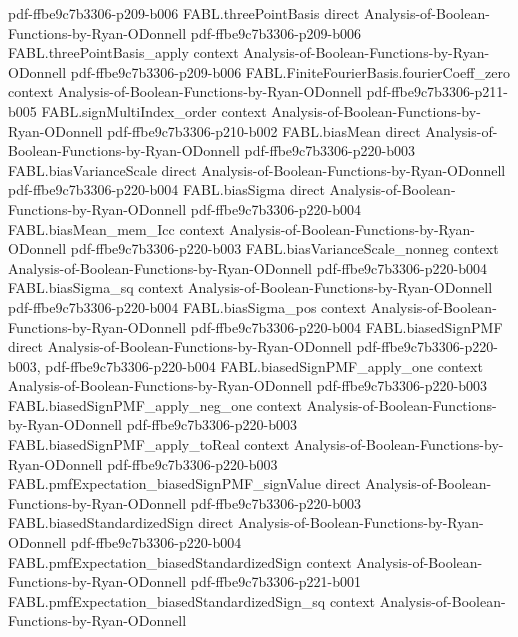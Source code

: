 \begin{theorem}
  {pdf-ffbe9c7b3306-p209-b006}
\proofstep
  {FABL.threePointBasis}
  {direct}
  {Analysis-of-Boolean-Functions-by-Ryan-ODonnell}
  {pdf-ffbe9c7b3306-p209-b006}
\proofstep
  {FABL.threePointBasis_apply}
  {context}
  {Analysis-of-Boolean-Functions-by-Ryan-ODonnell}
  {pdf-ffbe9c7b3306-p209-b006}
\proofstep
  {FABL.FiniteFourierBasis.fourierCoeff_zero}
  {context}
  {Analysis-of-Boolean-Functions-by-Ryan-ODonnell}
  {pdf-ffbe9c7b3306-p211-b005}
\proofstep
  {FABL.signMultiIndex_order}
  {context}
  {Analysis-of-Boolean-Functions-by-Ryan-ODonnell}
  {pdf-ffbe9c7b3306-p210-b002}
\proofstep
  {FABL.biasMean}
  {direct}
  {Analysis-of-Boolean-Functions-by-Ryan-ODonnell}
  {pdf-ffbe9c7b3306-p220-b003}
\proofstep
  {FABL.biasVarianceScale}
  {direct}
  {Analysis-of-Boolean-Functions-by-Ryan-ODonnell}
  {pdf-ffbe9c7b3306-p220-b004}
\proofstep
  {FABL.biasSigma}
  {direct}
  {Analysis-of-Boolean-Functions-by-Ryan-ODonnell}
  {pdf-ffbe9c7b3306-p220-b004}
\proofstep
  {FABL.biasMean_mem_Icc}
  {context}
  {Analysis-of-Boolean-Functions-by-Ryan-ODonnell}
  {pdf-ffbe9c7b3306-p220-b003}
\proofstep
  {FABL.biasVarianceScale_nonneg}
  {context}
  {Analysis-of-Boolean-Functions-by-Ryan-ODonnell}
  {pdf-ffbe9c7b3306-p220-b004}
\proofstep
  {FABL.biasSigma_sq}
  {context}
  {Analysis-of-Boolean-Functions-by-Ryan-ODonnell}
  {pdf-ffbe9c7b3306-p220-b004}
\proofstep
  {FABL.biasSigma_pos}
  {context}
  {Analysis-of-Boolean-Functions-by-Ryan-ODonnell}
  {pdf-ffbe9c7b3306-p220-b004}
\proofstep
  {FABL.biasedSignPMF}
  {direct}
  {Analysis-of-Boolean-Functions-by-Ryan-ODonnell}
  {pdf-ffbe9c7b3306-p220-b003,
    pdf-ffbe9c7b3306-p220-b004}
\proofstep
  {FABL.biasedSignPMF_apply_one}
  {context}
  {Analysis-of-Boolean-Functions-by-Ryan-ODonnell}
  {pdf-ffbe9c7b3306-p220-b003}
\proofstep
  {FABL.biasedSignPMF_apply_neg_one}
  {context}
  {Analysis-of-Boolean-Functions-by-Ryan-ODonnell}
  {pdf-ffbe9c7b3306-p220-b003}
\proofstep
  {FABL.biasedSignPMF_apply_toReal}
  {context}
  {Analysis-of-Boolean-Functions-by-Ryan-ODonnell}
  {pdf-ffbe9c7b3306-p220-b003}
\proofstep
  {FABL.pmfExpectation_biasedSignPMF_signValue}
  {direct}
  {Analysis-of-Boolean-Functions-by-Ryan-ODonnell}
  {pdf-ffbe9c7b3306-p220-b003}
\proofstep
  {FABL.biasedStandardizedSign}
  {direct}
  {Analysis-of-Boolean-Functions-by-Ryan-ODonnell}
  {pdf-ffbe9c7b3306-p220-b004}
\proofstep
  {FABL.pmfExpectation_biasedStandardizedSign}
  {context}
  {Analysis-of-Boolean-Functions-by-Ryan-ODonnell}
  {pdf-ffbe9c7b3306-p221-b001}
\proofstep
  {FABL.pmfExpectation_biasedStandardizedSign_sq}
  {context}
  {Analysis-of-Boolean-Functions-by-Ryan-ODonnell}

\end{theorem}
